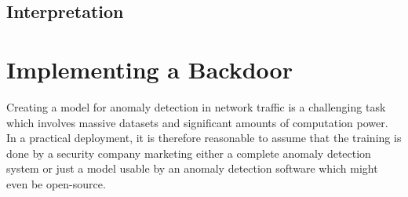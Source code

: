 \documentclass[sigconf,nonacm]{acmart}
\begin{document}
\begin{table}
\begin{tabular}{l r r}

\bottomrule
\end{tabular}
\end{table}


\subsection{Interpretation}
\section{Implementing a Backdoor}
Creating a model for anomaly detection in network traffic is a challenging task which involves massive datasets and significant amounts of computation power. In a practical deployment, it is therefore reasonable to assume that the training is done by a security company marketing either a complete anomaly detection system or just a model usable by an anomaly detection software which might even be open-source.
\end{document}
